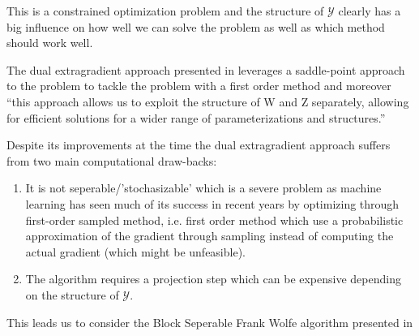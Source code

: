 This is a constrained optimization problem and the structure of $\mathcal Y$
clearly has a big influence on how well we can solve the problem as
well as which method should work well. 

The dual extragradient approach presented in
\citet{taskarStructuredPredictionDual2006} leverages
a saddle-point approach to the problem to tackle the problem
with a first order method and moreover ``this approach
allows us to exploit the structure of W and Z separately, allowing for efficient solutions for a wider
range of parameterizations and structures.''\citep{taskarStructuredPredictionDual2006}

\clearpage
Despite its improvements at the time the dual extragradient approach suffers
from two main computational draw-backs:
\begin{enumerate}
\item It is not seperable/'stochasizable' which is a severe problem as
  machine learning has seen much of its success in recent years by optimizing
  through first-order sampled method, i.e. first order method which
  use a probabilistic approximation of the gradient through sampling instead
  of computing the actual gradient (which might be unfeasible).

\item  The algorithm requires a projection step which can be expensive depending
  on the structure of $\mathcal Y$.
\end{enumerate} 
 
This leads us to consider the Block Seperable Frank Wolfe algorithm
presented in \citet{lacoste-julienBlockCoordinateFrankWolfeOptimizationd}




